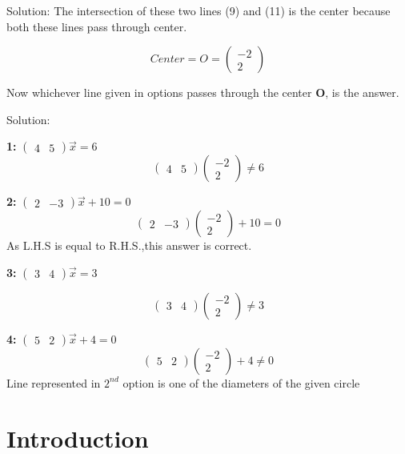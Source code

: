 \documentclass{beamer}
\newcommand{\myvec}[1]{\ensuremath{\begin{pmatrix}#1\end{pmatrix}}}
\begin{document}
\begin{frame}{Solution: }
    The intersection of these two lines (9) and (11) is the center because both these lines pass through center.\newline
    
\begin{equation}
        Center= O =\myvec{-2\\2}
\end{equation}

Now whichever line given in options passes through the center \textbf{O}, is the answer. 
\end{frame}

\begin{frame}{Solution: }
\item \textbf{1: }$\myvec{4 & 5}\vec{x} = 6 $ 
\begin{equation}
    \myvec{4 & 5}\myvec{-2\\2} \neq 6
\end{equation}


\item \textbf{2: }$\myvec{2 & -3}\vec{x} +10 = 0 $
\begin{equation}
    \myvec{2 & -3}\myvec{-2\\2} +10 = 0 
\end{equation}
As L.H.S is equal to R.H.S.,this answer is correct.
\end{frame}
\begin{frame}

\item \textbf{3: }$\myvec{3 & 4}\vec{x} = 3 $

\begin{equation}
    \myvec{3 & 4}\myvec{-2\\2} \neq 3 
\end{equation}


\item \textbf{4: }$\myvec{5 & 2}\vec{x} +4= 0 $
\begin{equation}
    \myvec{5 & 2}\myvec{-2\\2} +4 \neq 0 
\end{equation}
Line represented in $2^{nd}$ option is one of the diameters of the given circle

\end{frame}
\section{Introduction}
\end{document}

